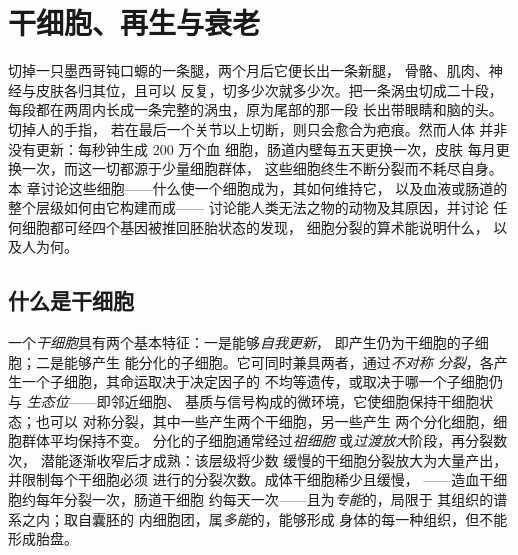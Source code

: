 \chapter{干细胞、再生与衰老}\label{ch:b3:stem-cells}

切掉一只墨西哥钝口螈的一条腿，两个月后它便长出一条新腿，
骨骼、肌肉、神经与皮肤各归其位，且可以
反复，切多少次就多少次。把一条涡虫切成二十段，
每段都在两周内长成一条完整的涡虫，原为尾部的那一段
长出带眼睛和脑的头。切掉人的手指，
若在最后一个关节以上切断，则只会愈合为疤痕。然而人体
并非没有更新：每秒钟生成 200 万个血
细胞，肠道内壁每五天更换一次，皮肤
每月更换一次，而这一切都源于少量细胞群体，
这些细胞终生不断分裂而不耗尽自身。本
章讨论这些细胞——什么使一个细胞成为，其如何维持它，
以及血液或肠道的整个层级如何由它构建而成——
讨论能人类无法之物的动物及其原因，并讨论
任何细胞都可经四个基因被推回胚胎状态的发现，
细胞分裂的算术能说明什么，
以及人为何。

\section{什么是干细胞}

\begin{definition}[干细胞及其层级]\label{def:b3:stem-cells:stem}
一个\emph{干细胞}具有两个基本特征：一是能够\emph{自我更新}，
即产生仍为干细胞的子细胞；二是能够产生
能分化的子细胞。它可同时兼具两者，通过\emph{不对称
分裂}，各产生一个子细胞，其命运取决于决定因子的
不均等遗传，或取决于哪一个子细胞仍与
\emph{生态位}——即邻近细胞、
基质与信号构成的微环境，它使细胞保持干细胞状态；也可以
对称分裂，其中一些产生两个干细胞，另一些产生
两个分化细胞，细胞群体平均保持不变。
分化的子细胞通常经过\emph{祖细胞}
或\emph{过渡放大}阶段，再分裂数次，
潜能逐渐收窄后才成熟：该层级将少数
缓慢的干细胞分裂放大为大量产出，并限制每个干细胞必须
进行的分裂次数。成体干细胞稀少且缓慢，
——造血干细胞约每年分裂一次，肠道干细胞
约每天一次——且为\emph{专能}的，局限于
其组织的谱系之内；取自囊胚的
内细胞团，属\emph{多能}的，能够形成
身体的每一种组织，但不能形成胎盘。
\end{definition}

